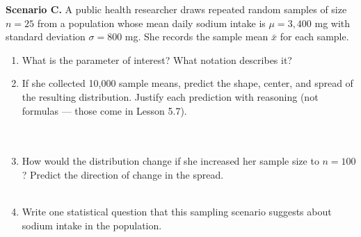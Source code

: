 \documentclass[10pt]{article}
\begin{document}
\begin{tcolorbox}[colback=redbg, colframe=black!40, boxrule=0.6pt, arc=2mm,
    left=3mm, right=3mm, top=2mm, bottom=2mm, title=\textbf{Tier E --- Extension}]
\textbf{Scenario C.} A public health researcher draws repeated random samples of size
$n = 25$ from a population whose mean daily sodium intake is $\mu = 3{,}400$ mg with
standard deviation $\sigma = 800$ mg. She records the sample mean $\bar{x}$ for each
sample.

\begin{enumerate}
  \item What is the parameter of interest? What notation describes it? \\
  \item If she collected 10,000 sample means, predict the shape, center, and
        spread of the resulting distribution. Justify each prediction with reasoning
        (not formulas --- those come in Lesson 5.7). \\
        \\
        \\
  \item How would the distribution change if she increased her sample size to $n = 100$?
        Predict the direction of change in the spread. \\
        \\
  \item Write one statistical question that this sampling scenario suggests about
        sodium intake in the population. \ansline{}\\
\end{enumerate}
\end{tcolorbox}
\end{document}
